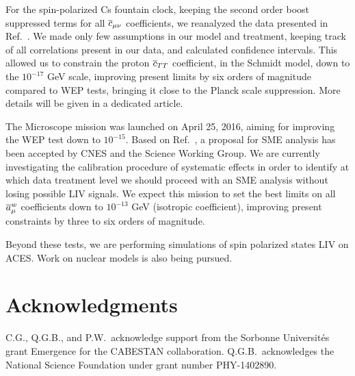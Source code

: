 \documentclass{ws-procs9x6-cpt16}
\begin{document}
For the spin-polarized Cs fountain clock,
keeping the second order boost suppressed terms for all $\overline{c}_{\mu\nu}$ coefficients, we
reanalyzed the data presented in Ref.\ . We made only few
assumptions in our model and treatment, keeping track of all
correlations present in our data, and calculated confidence intervals.
This allowed us to constrain the  proton $\overline{c}_{TT}$ coefficient, in the
Schmidt model, down to the $10^{-17}$ GeV scale, improving present limits by
six orders of magnitude compared to WEP tests,\cite{Kostelecky2011,datatables} bringing it close to the Planck scale
suppression. More details will be given in a dedicated article.\cite{HPB}

The Microscope mission was launched on April 25, 2016,
aiming for improving the WEP test\cite{Touboul2002} down to $10^{-15}$. Based on
Ref.\ , a proposal for SME
analysis 
has been
accepted by CNES and the Science Working Group. We are currently
investigating the calibration procedure of systematic effects in order to
identify at which data treatment level we should proceed with an SME
analysis without losing possible LIV signals.  We expect this mission
to set the best limits on all $\overline{a}^w_\mu$ coefficients down to
$10^{-13}$ GeV (isotropic coefficient), improving
present constraints by three to six orders of magnitude.\cite{Hees2015,datatables}

Beyond these tests, we are performing simulations of spin polarized states LIV on ACES.\cite{Laurent2015}
Work on nuclear models is also being pursued. 

\section*{Acknowledgments}
C.G., Q.G.B., and P.W.\ acknowledge support from the Sorbonne Universit\'es
grant Emergence for the CABESTAN collaboration. Q.G.B.\ acknowledges
the National Science Foundation under grant number PHY-1402890.
\end{document}
